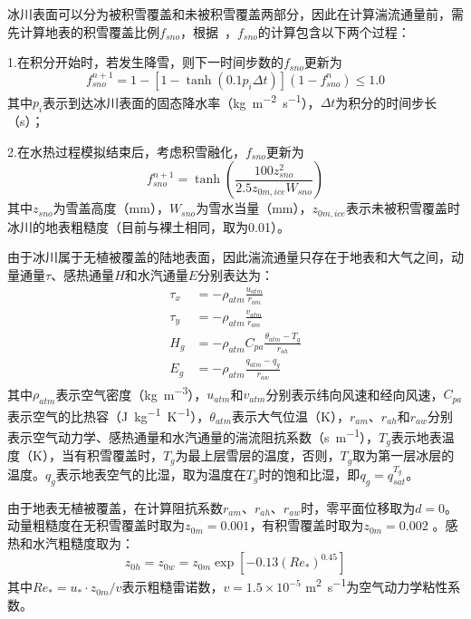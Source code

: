 冰川表面可以分为被积雪覆盖和未被积雪覆盖两部分，因此在计算湍流通量前，需先计算地表的积雪覆盖比例$f_{sno}$，根据~\citet{swenson2012new}，$f_{sno}$的计算包含以下两个过程：

1.在积分开始时，若发生降雪，则下一时间步数的$f_{sno}$更新为
\begin{equation}
    f^{n+1}_{sno}=1-\left[1-\tanh{\left(0.1 p_i \Delta t\right)}\right]\left(1-f^n_{sno}\right) \leqslant 1.0
\end{equation}
其中$p_i$表示到达冰川表面的固态降水率（\unit{kg.m^{-2}.s^{-1}}），$\Delta t$为积分的时间步长（s）；

2.在水热过程模拟结束后，考虑积雪融化，$f_{sno}$更新为
\begin{equation}
    f^{n+1}_{sno}=\tanh \left(\frac{100 z^2_{sno}}{2.5z_{0m,ice} W_{sno}}\right)
\end{equation}
其中$z_{sno}$为雪盖高度（mm），$W_{sno}$为雪水当量（mm），$z_{0m,ice}$表示未被积雪覆盖时冰川的地表粗糙度（目前与裸土相同，取为0.01）。


由于冰川属于无植被覆盖的陆地表面，因此湍流通量只存在于地表和大气之间，动量通量$\tau$、感热通量$H$和水汽通量$E$分别表达为：
\begin{align}
    \tau_x &= -\rho_{atm} \frac{u_{atm}}{r_{am}} \\
    \tau_y &= -\rho_{atm} \frac{v_{atm}}{r_{am}} \\
    H_g &= -\rho_{atm} C_{pa} \frac{\theta_{atm}-T_g}{r_{ah}} \\
    E_g &= -\rho_{atm} \frac{q_{atm}-q_g}{r_{aw}}
\end{align}
其中$\rho_{atm}$表示空气密度（\unit{kg.m^{-3}}），$u_{atm}$和$v_{atm}$分别表示纬向风速和经向风速，$C_{pa}$表示空气的比热容（\unit{J.kg^{-1}.K^{-1}}），$\theta_{atm}$表示大气位温（K），$r_{am}$、$r_{ah}$和$r_{aw}$分别表示空气动力学、感热通量和水汽通量的湍流阻抗系数（\unit{s.m^{-1}}），$T_g$表示地表温度（K），当有积雪覆盖时，$T_g$为最上层雪层的温度，否则，$T_g$取为第一层冰层的温度。$q_g$表示地表空气的比湿，取为温度在$T_g$时的饱和比湿，即$q_g=q^{T_g}_{sat}$。

由于地表无植被覆盖，在计算阻抗系数$r_{am}$、$r_{ah}$、$r_{aw}$时，零平面位移取为$d=0$。动量粗糙度在无积雪覆盖时取为$z_{0m}=0.001$，有积雪覆盖时取为$z_{0m}=0.002$ \citep{brock_willis_sharp_2006}。感热和水汽粗糙度取为：
\begin{equation}z_{0h}=z_{0w}=z_{0m}\exp{\left[-0.13\left(Re_*\right)^{0.45}\right]}
\end{equation}
其中$Re_*=u_*\cdot z_{0m}/v$表示粗糙雷诺数，$v= 1.5 \times 10^{-5}$ \unit{m^2.s^{-1}}为空气动力学粘性系数。

